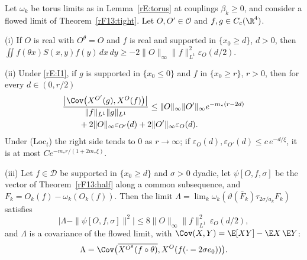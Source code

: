 \begin{proposition}\label{rF13:cluster}
Let $\omega_k$ be torus limits as in Lemma~\textup{\ref{rE:torus}} at
couplings $\beta_k\ge0$, and consider a flowed limit of
Theorem~\textup{\ref{rF13:tight}}. Let $O,O'\in\mathcal O$ and $f,g\in
C_c(\R^4)$.

\textup{(i)} If $O$ is real with $O^\theta=O$ and $f$ is real and supported
in $\{x_0\ge d\}$, $d>0$, then
$\iint f(\theta x)S(x,y)f(y)\,dx\,dy\ge-2\|O\|_\infty\|f\|_{L^1}^2
\varepsilon_O(d/2)$.

\textup{(ii)} Under \textup{\ref{rE:I1}}, if $g$ is supported in $\{x_0\le0\}$
and $f$ in $\{x_0\ge r\}$, $r>0$, then for every $d\in(0,r/2)$
\[
\begin{aligned}
&\frac{\bigl|\Cov\bigl(X^{O'}(g),X^O(f)\bigr)\bigr|}{\|f\|_{L^1}\|g\|_{L^1}}
\le\|O\|_\infty\|O'\|_\infty e^{-m_*(r-2d)}\\
&\qquad+2\|O\|_\infty\varepsilon_{O'}(d)+2\|O'\|_\infty\varepsilon_O(d).
\end{aligned}
\]
Under \textup{(Loc$_t$)} the right side tends to $0$ as $r\to\infty$; if
$\varepsilon_O(d),\varepsilon_{O'}(d)\le c\,e^{-d/\xi}$, it is at most
$C e^{-m_*r/(1+2m_*\xi)}$.

\textup{(iii)} Let $f\in\mathcal D$ be supported in $\{x_0\ge d\}$ and
$\sigma>0$ dyadic, let $\psi[O,f,\sigma]$ be the vector of
Theorem~\textup{\ref{rF13:half}} along a common subsequence, and
$F_k=O_k(f)-\omega_k(O_k(f))$. Then the limit $\Lambda=\lim_k\omega_k(\vartheta(\bar F_k)\tau_{2\sigma/a_k}F_k)$
satisfies
\[
\bigl|\Lambda-\|\psi[O,f,\sigma]\|^2\bigr|\le8\|O\|_\infty\|f\|_{L^1}^2\,
\varepsilon_O(d/2),
\]
and $\Lambda$ is a covariance of the flowed limit, with
$\Cov(X,Y)=\E[XY]-\E X\,\E Y$:
\[
\Lambda=\Cov\bigl(\overline{X^{O^\theta}(f\circ\theta)},X^O(f(\cdot-2\sigma
e_0))\bigr).
\]
\end{proposition}

